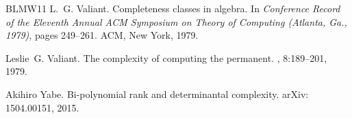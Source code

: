\documentclass{article}
\numberwithin{equation}{section}
\theoremstyle{definition}
\begin{document}
\begin{thebibliography}{BLMW11}
L.~G. Valiant.
\newblock Completeness classes in algebra.
\newblock In {\em Conference {R}ecord of the {E}leventh {A}nnual {ACM}
  {S}ymposium on {T}heory of {C}omputing ({A}tlanta, {G}a., 1979)}, pages
  249--261. ACM, New York, 1979.

Leslie~G. Valiant.
\newblock The complexity of computing the permanent.
, 8:189--201, 1979.

Akihiro Yabe.
\newblock Bi-polynomial rank and determinantal complexity.
\newblock arXiv: 1504.00151, 2015.

\end{thebibliography}
\end{document}

